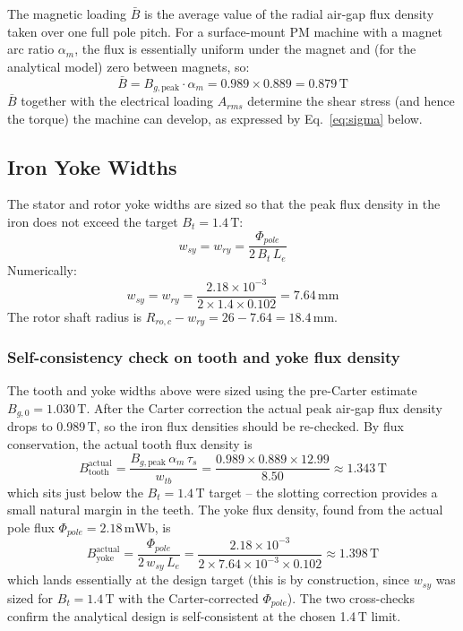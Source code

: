 \documentclass[12pt,a4paper]{article}
\newcommand{\unit}[1]{\ensuremath{\,\mathrm{#1}}}
\begin{document}
The magnetic loading $\bar{B}$ is the average value of the radial
air-gap flux density taken over one full pole pitch.
For a surface-mount PM machine with a magnet arc ratio $\alpha_m$, the
flux is essentially uniform under the magnet and (for the analytical
model) zero between magnets, so:
\begin{equation}
  \bar{B} = B_{g,\text{peak}} \cdot \alpha_m = 0.989 \times 0.889
          = \mathbf{0.879\unit{T}}
\end{equation}
$\bar{B}$ together with the electrical loading $A_{rms}$ determine the
shear stress (and hence the torque) the machine can develop, as
expressed by Eq.~\eqref{eq:sigma} below.

\subsection{Iron Yoke Widths}

The stator and rotor yoke widths are sized so that the peak flux density
in the iron does not exceed the target $B_t = 1.4\unit{T}$:
\begin{equation}
  w_{sy} = w_{ry} = \frac{\Phi_{pole}}{2\,B_t\,L_e}
  \label{eq:yoke}
\end{equation}
Numerically:
\begin{equation}
  w_{sy} = w_{ry} = \frac{2.18\times10^{-3}}{2 \times 1.4 \times 0.102}
         = \mathbf{7.64\unit{mm}}
\end{equation}
The rotor shaft radius is
$R_{ro,c} - w_{ry} = 26 - 7.64 = 18.4\unit{mm}$.

\subsubsection*{Self-consistency check on tooth and yoke flux density}

The tooth and yoke widths above were sized using the pre-Carter
estimate $B_{g,0} = 1.030\unit{T}$.
After the Carter correction the actual peak air-gap flux density drops
to 0.989\unit{T}, so the iron flux densities should be re-checked.
By flux conservation, the actual tooth flux density is
\begin{equation}
  B_{\text{tooth}}^{\text{actual}}
    = \frac{B_{g,\text{peak}}\,\alpha_m\,\tau_s}{w_{tb}}
    = \frac{0.989 \times 0.889 \times 12.99}{8.50}
    \approx \mathbf{1.343\unit{T}}
\end{equation}
which sits just below the $B_t = 1.4\unit{T}$ target -- the slotting
correction provides a small natural margin in the teeth.
The yoke flux density, found from the actual pole flux
$\Phi_{pole} = 2.18\unit{mWb}$, is
\begin{equation}
  B_{\text{yoke}}^{\text{actual}}
    = \frac{\Phi_{pole}}{2\,w_{sy}\,L_e}
    = \frac{2.18\times10^{-3}}{2 \times 7.64\times10^{-3} \times 0.102}
    \approx \mathbf{1.398\unit{T}}
\end{equation}
which lands essentially at the design target (this is by construction,
since $w_{sy}$ was sized for $B_t = 1.4\unit{T}$ with the
Carter-corrected $\Phi_{pole}$). The two cross-checks confirm the
analytical design is self-consistent at the chosen 1.4\unit{T} limit.
\end{document}
